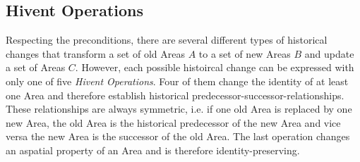 

\subsection{Hivent Operations} %
\label{sub:hivent_operations}

Respecting the preconditions, there are several different types of historical changes that transform a set of old Areas $A$ to a set of new Areas $B$ and update a set of Areas $C$. However, each possible histoircal change can be expressed with only one of five \emph{Hivent Operations}. Four of them change the identity of at least one Area and therefore establish historical predecessor-successor-relationships. These relationships are always symmetric, i.e. if one old Area is replaced by one new Area, the old Area is the historical predecessor of the new Area and vice versa the new Area is the successor of the old Area. The last operation changes an aspatial property of an Area and is therefore identity-preserving.

